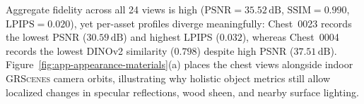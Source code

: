 \begin{table}[!htbp]
\centering\small
\resizebox{\linewidth}{!}{}
\caption{Matched object renders averaged over six camera directions per asset. Higher PSNR (dB), SSIM, CLIP, and DINOv2 indicate stronger visual similarity; lower LPIPS indicates closer perceptual match.}
\label{tab:app-proxy}
\end{table}

Aggregate fidelity across all 24 views is high ($\mathrm{PSNR}=35.52\,\mathrm{dB}$, $\mathrm{SSIM}=0.990$, $\mathrm{LPIPS}=0.020$), yet per-asset profiles diverge meaningfully: Chest~0023 records the lowest PSNR ($30.59\,\mathrm{dB}$) and highest LPIPS ($0.032$), whereas Chest~0004 records the lowest DINOv2 similarity ($0.798$) despite high PSNR ($37.51\,\mathrm{dB}$). Figure~\ref{fig:app-appearance-materials}(a) places the chest views alongside indoor \textsc{GRScenes} camera orbits, illustrating why holistic object metrics still allow localized changes in specular reflections, wood sheen, and nearby surface lighting.
